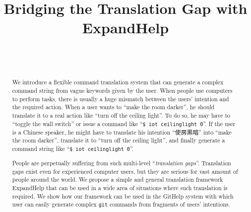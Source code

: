 \documentclass{sigchi}
\def\plaintitle{Bridging the Translation Gap with ExpandHelp}
\def\GH{\textsf{GitHelp}}
\def\EH{\textsf{ExpandHelp}}
\begin{document}
\title{\plaintitle}

\author{%
  \\
  \\
}

\maketitle

\begin{abstract}
  We introduce a flexible command translation system that can generate
  a complex command string from vague keywords
  given by the user.
  When people use computers to perform tasks,
  there is usually a huge mismatch between the users' intention
  and the required action.
  When a user wants to ``make the room darker'',
  he should translate it to a real action like ``turn off the ceiling light''.
  To do so,
  he may have to ``toggle the wall switch''
  or issue a command like ``\texttt{\$ iot ceilinglight 0}''.
  If the user is a Chinese speaker, he might have to translate his intention
  ``使房黒暗'' into ``make the room darker'',
  translate it to ``turn off the ceiling light'', 
  and finally generate a command string like ``\texttt{\$ iot ceilinglight 0}''.

  People are perpetually suffering from such multi-level ``\textit{translation gaps}''.
  Translation gaps exist even for experienced computer users, but
  they are serious for vast amount of people around the world.
  We propose a simple and general translation framework
  {\EH} that can be used in a wide area of situations
  where such translation is required.
  We show how our framework can be used
  in the {\GH} system
  with which user can easily generate complex \texttt{git} commands
  from fragments of users' intentions.

\end{abstract}

 
\end{document}
